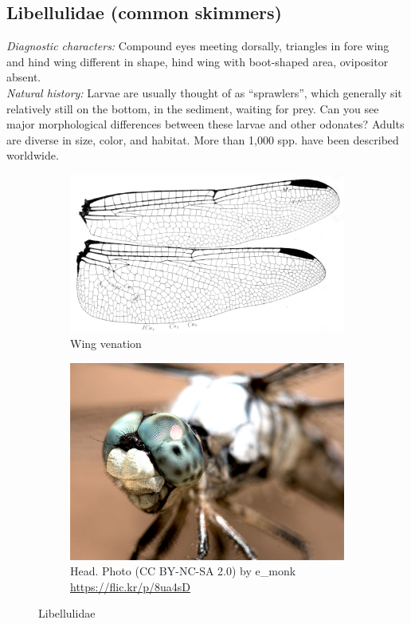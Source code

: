 \documentclass[letterpaper, 11pt]{article}
\begin{document}
\subsection{Libellulidae (common skimmers)} 
\noindent{}\textit{Diagnostic characters:} Compound eyes meeting dorsally, triangles in fore wing and hind wing different in shape, hind wing with boot-shaped area, ovipositor absent.\\

\noindent{}\textit{Natural history:} Larvae are usually thought of as ``sprawlers'', which generally sit relatively still on the bottom, in the sediment, waiting for prey. Can you see major morphological differences between these larvae and other odonates? Adults are diverse in size, color, and habitat. More than 1,000 spp. have been described worldwide.\\

\begin{figure}[ht!]
    \centering
    \begin{subfigure}[ht!]{0.45\textwidth}
        \includegraphics[width=\textwidth]{LibellulidWings}
        \caption{Wing venation \citep[][Fig. 240]{comstock1918wings}}
        \label{fig:libelwing}
    \end{subfigure}
    \hfill
    \begin{subfigure}[ht!]{0.45\textwidth}
        \includegraphics[width=\textwidth]{LibellulidHead}
        \caption{Head. Photo (CC BY-NC-SA 2.0) by e\_monk \url{https://flic.kr/p/8ua4sD}}
        \label{fig:libelbody}
    \end{subfigure}
    \caption{Libellulidae}\label{fig:libell}
\end{figure}
\end{document}

